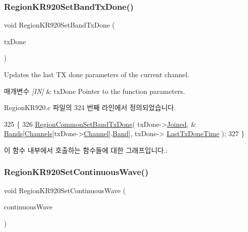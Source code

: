 \subsubsection{\texorpdfstring{Region\+K\+R920\+Set\+Band\+Tx\+Done()}{RegionKR920SetBandTxDone()}}
{\footnotesize\ttfamily void Region\+K\+R920\+Set\+Band\+Tx\+Done (\begin{DoxyParamCaption}\item[{\mbox{\hyperlink{group___r_e_g_i_o_n_gad0524aa0673c0814a71e7a4f9cade3fc}{Set\+Band\+Tx\+Done\+Params\+\_\+t}} $\ast$}]{tx\+Done }\end{DoxyParamCaption})}



Updates the last TX done parameters of the current channel. 


\begin{DoxyParams}{매개변수}
{\em \mbox{[}\+I\+N\mbox{]}} & tx\+Done Pointer to the function parameters. \\
\hline
\end{DoxyParams}


Region\+K\+R920.\+c 파일의 324 번째 라인에서 정의되었습니다.


\begin{DoxyCode}
325 \{
326     \mbox{\hyperlink{group___r_e_g_i_o_n_c_o_m_m_o_n_ga491dea5590228a0cd33affd71743779c}{RegionCommonSetBandTxDone}}( txDone->\mbox{\hyperlink{structs_set_band_tx_done_params_ac2f6caa0f3b02d2ac5056c3ee7c22652}{Joined}}, &
      \mbox{\hyperlink{_region_k_r920_8c_a12f2ea1fb6e7f8812338a8192ce15797}{Bands}}[\mbox{\hyperlink{_region_k_r920_8c_aa22cc2ed5f1e155ccf4f0c0388da513e}{Channels}}[txDone->\mbox{\hyperlink{structs_set_band_tx_done_params_a1ca6f01ca18afe402de51babe8c95f5e}{Channel}}].\mbox{\hyperlink{structs_channel_params_a724c03aa06953111c3291243831f251b}{Band}}], txDone->
      \mbox{\hyperlink{structs_set_band_tx_done_params_a7316dfb002c4e0015fceeb727020fe5c}{LastTxDoneTime}} );
327 \}
\end{DoxyCode}
이 함수 내부에서 호출하는 함수들에 대한 그래프입니다.\+:
\mbox{\label{group___r_e_g_i_o_n_k_r920_gaaa9c13bab01bbfc0445b49587c59b8e7}} 
\subsubsection{\texorpdfstring{Region\+K\+R920\+Set\+Continuous\+Wave()}{RegionKR920SetContinuousWave()}}
{\footnotesize\ttfamily void Region\+K\+R920\+Set\+Continuous\+Wave (\begin{DoxyParamCaption}\item[{\mbox{\hyperlink{group___r_e_g_i_o_n_gaf39bb5ba06921139c6d17f88a8d518cd}{Continuous\+Wave\+Params\+\_\+t}} $\ast$}]{continuous\+Wave }\end{DoxyParamCaption})}



